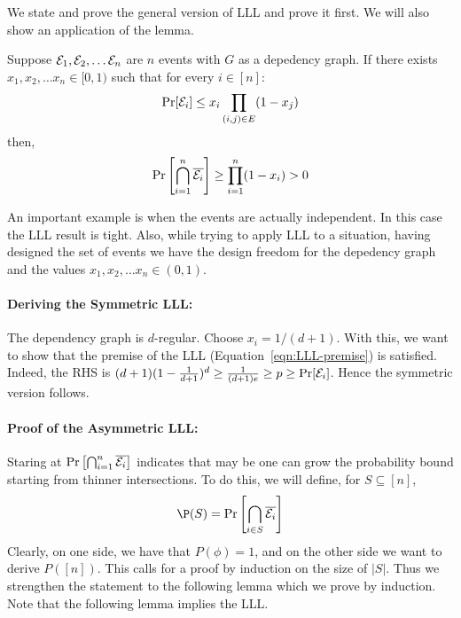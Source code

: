 We state and prove the general version of LLL and prove it first. We will also show an application of the lemma.

\begin{theorem}
Suppose ${\cal E}_1, {\cal E}_2, \ldots {\cal E}_n$ are $n$ events with $G$ as a depedency graph.
If there exists $x_1, x_2, \ldots x_n \in [0,1)$ such that for every $i \in [n]$:
\begin{equation}
\Pr[{\cal E}_i] \le x_i \prod_{(i,j)\in E}(1-x_j)
\label{eqn:LLL-premise}
\end{equation}
then, $$\Pr\left[\bigcap_{i=1}^n \overline{{\cal E}_i}\right] \ge \prod_{i=1}^{n}(1-x_i) > 0$$
\end{theorem}

An important example is when the events are actually independent. In this case the LLL result is tight.
Also, while trying to apply LLL to a situation, having designed the set of events we have the design freedom for the depedency graph and the values $x_1, x_2, \ldots x_n \in(0,1)$. 

\paragraph{Deriving the Symmetric LLL:}
The dependency graph is $d$-regular. Choose $x_i = 1/(d+1)$. With this, we want to show that the premise of the LLL (Equation~\ref{eqn:LLL-premise}) is satisfied.
Indeed, the RHS is $(d+1)(1-\frac{1}{d+1})^{d} \ge \frac{1}{(d+1)e} \ge p \ge \Pr[{\cal E}_i]$. Hence the symmetric version follows.

\paragraph{Proof of the Asymmetric LLL:}
Staring at $\Pr\left[\bigcap_{i=1}^n \overline{{\cal E}_i}\right]$ indicates that may be one can grow the probability bound starting from thinner intersections. To do this, we will define, for $S \subseteq [n]$,
$$\P(S) = \Pr\left[\bigcap_{i\in S} \overline{\calE_i}\right]$$
Clearly, on one side, we have that $P(\phi)=1$, and on the other side we want to derive $P([n])$. This calls for a proof by induction on the size of $|S|$. Thus we strengthen the statement to the following lemma which we prove by induction. Note that the following lemma implies the LLL.

